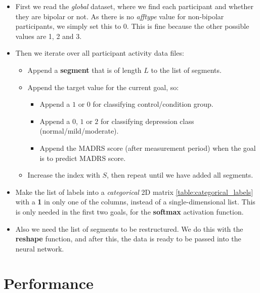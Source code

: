 \begin{itemize}
      \item First we read the \textit{global} dataset, where we find each participant and whether they are bipolar or not. As there is no \textit{afftype} value
            for non-bipolar participants, we simply set this to 0. This is fine because the other possible values are 1, 2 and 3.
      \item Then we iterate over all participant activity data files:

      \begin{itemize}
        \item Append a \textbf{segment} that is of length $L$ to the list of segments.
        \item Append the target value for the current goal, so:
          \begin{itemize}
                \item Append a $1$ or $0$ for classifying control/condition group.
                \item Append a $0$, $1$ or $2$ for classifying depression class \\(normal/mild/moderate).
                \item Append the MADRS score (after measurement period) when the goal is to predict MADRS score.
          \end{itemize}  
        \item Increase the index with $S$, then repeat until we have added all segments.
      \end{itemize}

      \item Make the list of labels into a \textit{categorical} 2D matrix \ref{table:categorical_labels} with a \textbf{1} in only one of the columns,
            instead of a single-dimensional list.
            This is only needed in the first two goals, for the \textbf{softmax} activation function.
      \item Also we need the list of segments to be restructured. We do this with the \textbf{reshape} function, 
            and after this, the data is ready to be passed into the neural network.
\end{itemize}

\section{Performance}

